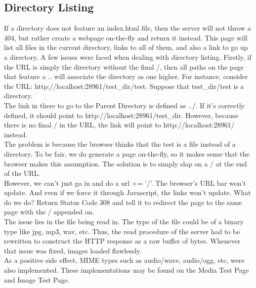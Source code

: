     \subsection{Directory Listing}
    If a directory does not feature an index.html file, then the server will not throw a 404, but rather create a webpage on-the-fly and return it instead. This page will list all files in the current directory, links to all of them, and also a link to go up a directory. A few issues were faced when dealing with directory listing. Firstly, if the URL is simply the directory without the final /, then all paths on the page that feature a .. will associate the directory as one higher. For instance, consider the URL: http://localhost:28961/test\_dir/test. Suppose that test\_dir/test is a directory. \\
    The link in there to go to the Parent Directory is defined as ../. If it's correctly defined, it should point to http://localhost:28961/test\_dir. However, because there is no final / in the URL, the link will point to http://localhost:28961/ instead. \\
    The problem is because the browser thinks that the test is a file instead of a directory. To be fair, we do generate a page on-the-fly, so it makes sense that the browser makes this assumption. The solution is to simply slap on a / at the end of the URL.\\
However, we can't just go in and do a url += '/'. The browser's URL bar won't update. And even if we force it through Javascript, the links won't update. What do we do? Return Status Code 308 and tell it to redirect the page to the same page with the / appended on.\\
The issue lies in the file being read in. The type of the file could be of a binary type like jpg, mp3, wav, etc. Thus, the read procedure of the server had to be rewritten to construct the HTTP response as a raw buffer of bytes. Whenever that issue was fixed, images loaded flawlessly. \\
As a positive side effect, MIME types such as audio/wave, audio/ogg, etc, were also implemented. These implementations may be found on the Media Test Page and Image Test Page.
